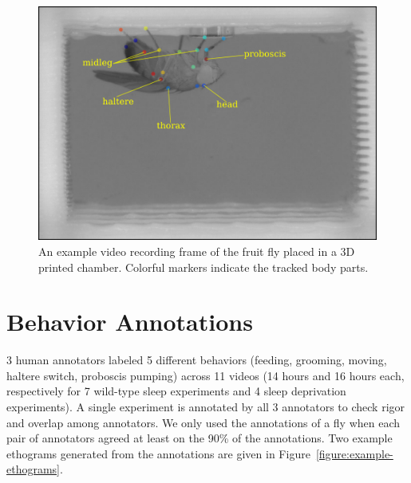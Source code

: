 \begin{figure}[htb!]
	\centering
	\includegraphics[width=0.6\linewidth]{figures/FlyTrackedBodyParts.png}
	\caption[An example frame of the fruit fly placed in a 3D printed chamber.] {An example video recording frame of the fruit fly placed in a 3D printed chamber. Colorful markers indicate the tracked body parts.\label{figure:example-labeled-frame}}
\end{figure}

\section{Behavior Annotations}\label{section:behavior-annotations}
3 human annotators labeled 5 different behaviors (feeding, grooming, moving, haltere switch, proboscis pumping) across 11 videos (14 hours and 16 hours each, respectively for 7 wild-type sleep experiments and 4 sleep deprivation experiments).
A single experiment is annotated by all 3 annotators to check rigor and overlap among annotators.
We only used the annotations of a fly when each pair of annotators agreed at least on the 90\% of the annotations.
Two example ethograms generated from the annotations are given in Figure~\ref{figure:example-ethograms}.

